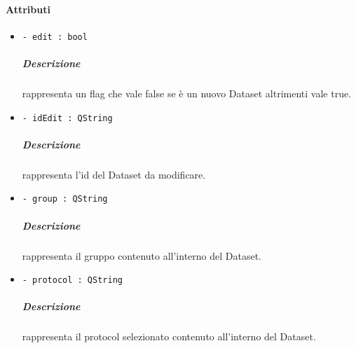 	\paragraph{Attributi}
		\begin{itemize}
			\item \color{teal} \verb!- edit : bool!
			\color{black}
			\subparagraph{Descrizione} rappresenta un flag che vale false se è un nuovo Dataset\g{} altrimenti vale true.
			\item \color{teal} \verb!- idEdit : QString!
			\color{black}
			\subparagraph{Descrizione} rappresenta l'id del Dataset\g{} da modificare.
			\item \color{teal} \verb!- group : QString!
			\color{black}
			\subparagraph{Descrizione} rappresenta il gruppo contenuto all'interno del Dataset\g{}.
			\item \color{teal} \verb!- protocol : QString!
			\color{black}
			\subparagraph{Descrizione} rappresenta il protocol selezionato contenuto all'interno del Dataset\g{}.
		\end{itemize}
